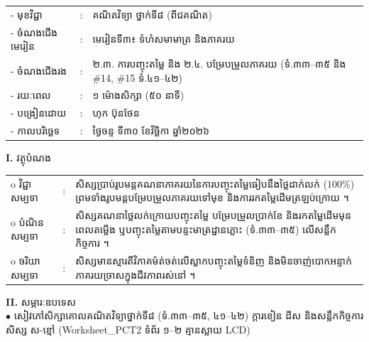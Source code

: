 \documentclass[a4paper,10pt]{article}
\newcommand{\wcirc}{{\CourierBullet\fontsize{9.5pt}{11pt}\selectfont o}}
\newcommand{\en}[1]{{\TimesEn #1}}
\begin{document}
{\renewcommand{\arraystretch}{0.98}
\hspace*{3.1cm}%
\begin{tabular}{@{}l l L{11.0cm}@{}}
  - \hspace{0.35cm} មុខវិជ្ជា & : & គណិតវិទ្យា ថ្នាក់ទី៨ (ពីជគណិត) \\
  - \hspace{0.35cm} ចំណងជើងមេរៀន & : & មេរៀនទី៣៖ ទំហំសមាមាត្រ និងភាគរយ \\
  - \hspace{0.35cm} ចំណងជើងរង & : & ២.៣. ការបញ្ចុះតម្លៃ និង ២.៤. បម្រែបម្រួលភាគរយ (ទំ.៣៣–៣៥ និង \#14, \#15 ទំ.៤១–៤២) \\
  - \hspace{0.35cm} រយៈពេល & : & ១ ម៉ោងសិក្សា (៥០ នាទី) \\
  - \hspace{0.35cm} បង្រៀនដោយ & : & ហុក ប៊ុនថែន \\
  - \hspace{0.35cm} កាលបរិច្ឆេទ & : & ថ្ងៃចន្ទ ទី៣០ ខែវិច្ឆិកា ឆ្នាំ២០២៦ \\
\end{tabular}

\vspace{2pt}

\textbf{I.} {\muol វត្ថុបំណង}\\[1pt]
\hspace*{0.55cm}%
\begin{tabular}{@{}l l L{14.2cm}@{}}
  \wcirc \hspace{0.25cm} វិជ្ជាសម្បទា & : & សិស្សប្រាប់រូបមន្តគណនាភាគរយនៃការបញ្ចុះតម្លៃធៀបនឹងថ្លៃដាក់លក់ ($100\%$) ព្រមទាំងរូបមន្តបម្រែបម្រួលភាគរយទៅមុខ និងការរកតម្លៃដើមត្រឡប់ក្រោយ ។ \\
  \wcirc \hspace{0.25cm} បំណិនសម្បទា & : & សិស្សគណនាថ្លៃលក់ក្រោយបញ្ចុះតម្លៃ បម្រែបម្រួលប្រាក់ខែ និងរកតម្លៃដើមមុនពេលតម្លើង ឬបញ្ចុះតម្លៃតាមបន្ទះមាត្រដ្ឋានភ្លោះ (ទំ.៣៣–៣៥) លើសន្លឹកកិច្ចការ ។ \\
  \wcirc \hspace{0.25cm} ចរិយាសម្បទា & : & សិស្សមានស្មារតីវិភាគម៉ត់ចត់លើស្លាកបញ្ចុះតម្លៃទំនិញ និងមិនចាញ់បោកអន្ទាក់ភាគរយច្រាសក្នុងជីវភាពរស់នៅ ។ \\
\end{tabular}

\vspace{2pt}

\textbf{II.} {\muol សម្ភារៈឧបទេស}\\[1pt]
\hspace*{0.55cm}$\bullet$ \hspace{0.35cm} សៀវភៅសិក្សាគោលគណិតវិទ្យាថ្នាក់ទី៨ (ទំ.៣៣–៣៥, ៤១–៤២) ក្ដារខៀន ដីស និងសន្លឹកកិច្ចការសិស្ស ស-ខ្មៅ (\en{Worksheet\_PCT2} ទំព័រ ១–២ គ្មានស្លាយ \en{LCD})

}
\end{document}
